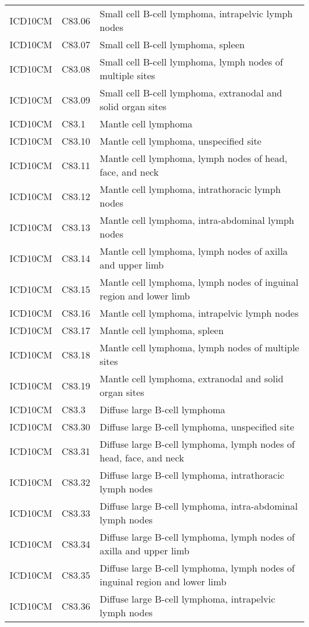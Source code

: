 \begin{longtable}{p{}p{}p{}}
  ICD10CM & C83.06 & Small cell B-cell lymphoma, intrapelvic lymph nodes \\ 
  ICD10CM & C83.07 & Small cell B-cell lymphoma, spleen \\ 
  ICD10CM & C83.08 & Small cell B-cell lymphoma, lymph nodes of multiple sites \\ 
  ICD10CM & C83.09 & Small cell B-cell lymphoma, extranodal and solid organ sites \\ 
  ICD10CM & C83.1 & Mantle cell lymphoma \\ 
  ICD10CM & C83.10 & Mantle cell lymphoma, unspecified site \\ 
  ICD10CM & C83.11 & Mantle cell lymphoma, lymph nodes of head, face, and neck \\ 
  ICD10CM & C83.12 & Mantle cell lymphoma, intrathoracic lymph nodes \\ 
  ICD10CM & C83.13 & Mantle cell lymphoma, intra-abdominal lymph nodes \\ 
  ICD10CM & C83.14 & Mantle cell lymphoma, lymph nodes of axilla and upper limb \\ 
  ICD10CM & C83.15 & Mantle cell lymphoma, lymph nodes of inguinal region and lower limb \\ 
  ICD10CM & C83.16 & Mantle cell lymphoma, intrapelvic lymph nodes \\ 
  ICD10CM & C83.17 & Mantle cell lymphoma, spleen \\ 
  ICD10CM & C83.18 & Mantle cell lymphoma, lymph nodes of multiple sites \\ 
  ICD10CM & C83.19 & Mantle cell lymphoma, extranodal and solid organ sites \\ 
  ICD10CM & C83.3 & Diffuse large B-cell lymphoma \\ 
  ICD10CM & C83.30 & Diffuse large B-cell lymphoma, unspecified site \\ 
  ICD10CM & C83.31 & Diffuse large B-cell lymphoma, lymph nodes of head, face, and neck \\ 
  ICD10CM & C83.32 & Diffuse large B-cell lymphoma, intrathoracic lymph nodes \\ 
  ICD10CM & C83.33 & Diffuse large B-cell lymphoma, intra-abdominal lymph nodes \\ 
  ICD10CM & C83.34 & Diffuse large B-cell lymphoma, lymph nodes of axilla and upper limb \\ 
  ICD10CM & C83.35 & Diffuse large B-cell lymphoma, lymph nodes of inguinal region and lower limb \\ 
  ICD10CM & C83.36 & Diffuse large B-cell lymphoma, intrapelvic lymph nodes \\ 

\end{longtable}
